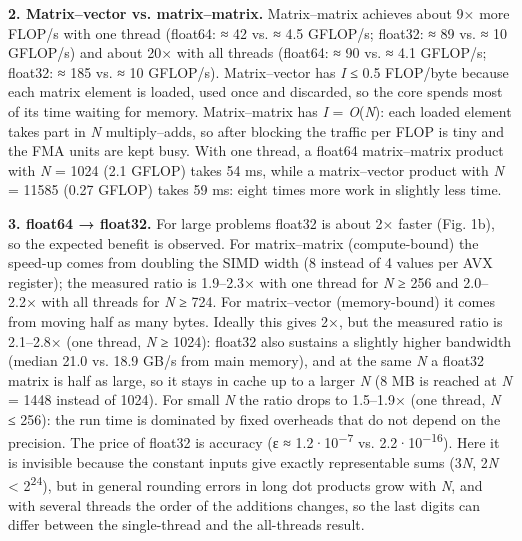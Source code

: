 \documentclass[10pt,a4paper]{article}
\begin{document}
\textbf{2. Matrix–vector vs. matrix–matrix.} Matrix–matrix achieves about 9× more FLOP/s with one thread (float64: ≈ 42 vs. ≈ 4.5 GFLOP/s; float32: ≈ 89 vs. ≈ 10 GFLOP/s) and about 20× with all threads (float64: ≈ 90 vs. ≈ 4.1 GFLOP/s; float32: ≈ 185 vs. ≈ 10 GFLOP/s). Matrix–vector has \emph{I} ≤ 0.5 FLOP/byte because each matrix element is loaded, used once and discarded, so the core spends most of its time waiting for memory. Matrix–matrix has \emph{I} = \emph{O}(\emph{N}): each loaded element takes part in \emph{N} multiply–adds, so after blocking the traffic per FLOP is tiny and the FMA units are kept busy. With one thread, a float64 matrix–matrix product with \emph{N} = 1024 (2.1 GFLOP) takes 54 ms, while a matrix–vector product with \emph{N} = 11585 (0.27 GFLOP) takes 59 ms: eight times more work in slightly less time.

\textbf{3. float64 → float32.} For large problems float32 is about 2× faster (Fig. 1b), so the expected benefit is observed. For matrix–matrix (compute-bound) the speed-up comes from doubling the SIMD width (8 instead of 4 values per AVX register); the measured ratio is 1.9–2.3× with one thread for \emph{N} ≥ 256 and 2.0–2.2× with all threads for \emph{N} ≥ 724. For matrix–vector (memory-bound) it comes from moving half as many bytes. Ideally this gives 2×, but the measured ratio is 2.1–2.8× (one thread, \emph{N} ≥ 1024): float32 also sustains a slightly higher bandwidth (median 21.0 vs. 18.9 GB/s from main memory), and at the same \emph{N} a float32 matrix is half as large, so it stays in cache up to a larger \emph{N} (8 MB is reached at \emph{N} = 1448 instead of 1024). For small \emph{N} the ratio drops to 1.5–1.9× (one thread, \emph{N} ≤ 256): the run time is dominated by fixed overheads that do not depend on the precision. The price of float32 is accuracy (ε ≈ 1.2·10\textsuperscript{−7} vs. 2.2·10\textsuperscript{−16}). Here it is invisible because the constant inputs give exactly representable sums (3\emph{N}, 2\emph{N} < 2\textsuperscript{24}), but in general rounding errors in long dot products grow with \emph{N}, and with several threads the order of the additions changes, so the last digits can differ between the single-thread and the all-threads result.
\end{document}
